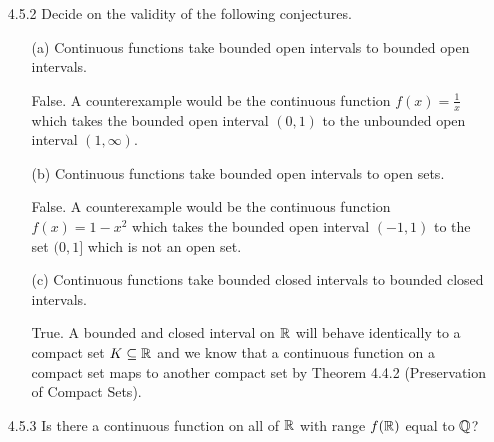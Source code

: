 \documentclass[12pt,letterpaper]{article}
\begin{document}
\begin{itemize}[leftmargin=!,labelindent=5pt]
\begin{proof}
                Next, we need to show that if $g^{-1}(O)$ is open whenever $O \subseteq \bbR$ is an open set, then $g$ is continuous -- that is given an arbitrary point $c \in \bbR$, for all $V_\epsilon(g(c))$ there exists a $V_\delta(c)$ such that $x \in V_\delta(c)$ implies $g(x) \in V_\epsilon(g(c))$.
                Choose an arbitrary point $c \in \bbR$ and $\epsilon > 0$. 
                Let $O$ be the open set given by $V_\epsilon(g(c))$.
                This means that $g^{-1}(O)$ is open -- that is, there exists a $\delta > 0$ such that $V_\delta(c) \subseteq g^{-1}(O)$.
                Choose such a $\delta$.
                Then, for all $x \in V_\delta(c)$, $g(x) \in O$ which means $g(x) \in V_\epsilon(g(c))$ as desired.
                Thus, $g$ is continuous by Theorem 4.3.2 (iii) (Characterizations of Continuity).

            \end{proof}
        \item [4.5.2] Decide on the validity of the following conjectures.
            \begin{itemize}
                \item [(a)] Continuous functions take bounded open intervals to bounded open intervals.
                
                    False. A counterexample would be the continuous function $f(x) = \frac{1}{x}$ which takes the bounded open interval $(0,1)$ to the unbounded open interval $(1, \infty)$.
                \item [(b)] Continuous functions take bounded open intervals to open sets.

                    False. A counterexample would be the continuous function $f(x) = 1-x^2$ which takes the bounded open interval $(-1,1)$ to the set $(0, 1]$ which is not an open set.
                \item [(c)] Continuous functions take bounded closed intervals to bounded closed intervals.
                
                    True. A bounded and closed interval on $\mathbb{R}$ will behave identically to a compact set $K \subseteq \mathbb{R}$ and we know that a continuous function on a compact set maps to another compact set by Theorem 4.4.2 (Preservation of Compact Sets).
            \end{itemize}
        \item [4.5.3] Is there a continuous function on all of $\mathbb{R}$ with range $f(\mathbb{R})$ equal to $\mathbb{Q}$?
        

\end{itemize}
\end{document}
